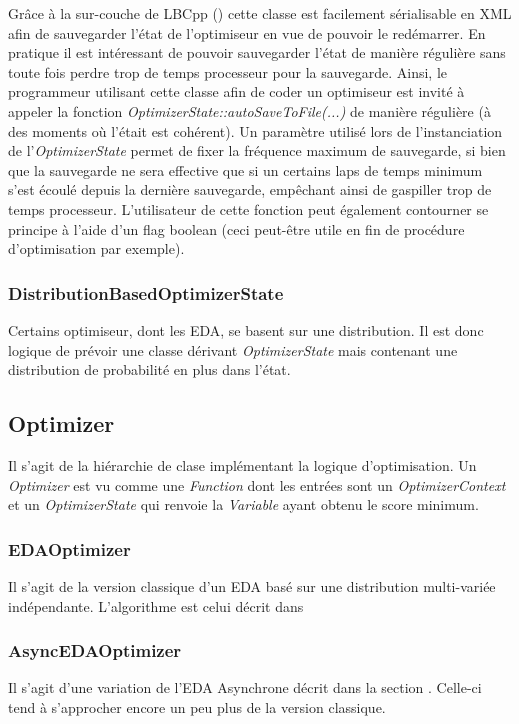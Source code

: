 \documentclass[a4paper, 11pt]{article}
\begin{document}
Grâce à la sur-couche de LBCpp ()%
cette classe est facilement sérialisable en XML afin de sauvegarder l'état de l'optimiseur en vue de pouvoir le redémarrer. En pratique il est intéressant de pouvoir sauvegarder l'état de manière régulière sans toute fois perdre trop de temps processeur pour la sauvegarde. Ainsi, le programmeur utilisant cette classe afin de coder un optimiseur est invité à appeler la fonction \textit{OptimizerState::autoSaveToFile(...)} de manière régulière (à des moments où l'était est cohérent). Un paramètre utilisé lors de l'instanciation de l'\textit{OptimizerState} permet de fixer la fréquence maximum de sauvegarde, si bien que la sauvegarde ne sera effective que si un certains laps de temps minimum s'est écoulé depuis la dernière sauvegarde, empêchant ainsi de gaspiller trop de temps processeur. L'utilisateur de cette fonction peut également contourner se principe à l'aide d'un flag boolean (ceci peut-être utile en fin de procédure d'optimisation par exemple). 

\subsubsection{DistributionBasedOptimizerState}
Certains optimiseur, dont les EDA, se basent sur une distribution. Il est donc logique de prévoir une classe dérivant \textit{OptimizerState} mais contenant une distribution de probabilité en plus dans l'état.


\subsection{Optimizer}
Il s'agit de la hiérarchie de clase implémentant la logique d'optimisation. Un \textit{Optimizer} est vu comme une \textit{Function} dont les entrées sont un \textit{OptimizerContext} et un \textit{OptimizerState} qui renvoie la \textit{Variable} ayant obtenu le score minimum.

\subsubsection{EDAOptimizer}
Il s'agit de la version classique d'un EDA basé sur une distribution multi-variée indépendante. L'algorithme est celui décrit dans %

\subsubsection{AsyncEDAOptimizer}
Il s'agit d'une variation de l'EDA Asynchrone décrit dans la section .%
Celle-ci tend à s'approcher encore un peu plus de la version classique. 
\end{document}

